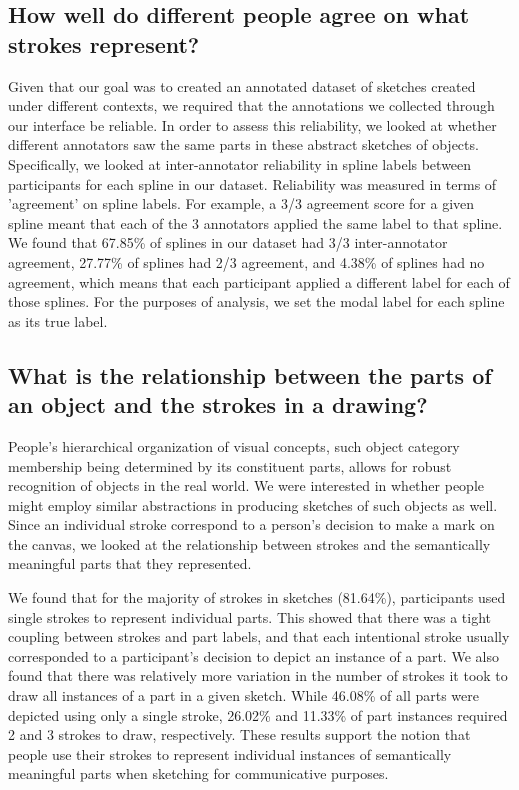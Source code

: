 \documentclass[10pt,letterpaper]{article}
\begin{document}
\subsection{How well do different people agree on what strokes represent?}

Given that our goal was to created an annotated dataset of sketches created under different contexts, we required that the annotations we collected through our interface be reliable. 
In order to assess this reliability, we looked at whether different annotators saw the same parts in these abstract sketches of objects. 
Specifically, we looked at inter-annotator reliability in spline labels between participants for each spline in our dataset. 
Reliability was measured in terms of 'agreement' on spline labels. 
For example, a 3/3 agreement score for a given spline meant that each of the 3 annotators applied the same label to that spline. 
We found that 67.85\% of splines in our dataset had 3/3 inter-annotator agreement, 27.77\% of splines had 2/3 agreement, and 4.38\% of splines had no agreement, which means that each participant applied a different label for each of those splines.
For the purposes of analysis, we set the modal label for each spline as its true label.

\subsection{What is the relationship between the parts of an object and the strokes in a drawing?}



People's hierarchical organization of visual concepts, such object category membership being determined by its constituent parts, allows for robust recognition of objects in the real world. 
We were interested in whether people might employ similar abstractions in producing sketches of such objects as well. 
Since an individual stroke correspond to a person's decision to make a mark on the canvas, we looked at the relationship between strokes and the semantically meaningful parts that they represented.

We found that for the majority of strokes in sketches (81.64\%), participants used single strokes to represent individual parts. This showed that there was a tight coupling between strokes and part labels, and that each intentional stroke usually corresponded to a participant's decision to depict an instance of a part.
We also found that there was relatively more variation in the number of strokes it took to draw all instances of a part in a given sketch. While 46.08\% of all parts were depicted using only a single stroke, 26.02\% and 11.33\% of part instances required 2 and 3 strokes to draw, respectively. 
These results support the notion that people use their strokes to represent individual instances of semantically meaningful parts when sketching for  communicative purposes.
\end{document}
